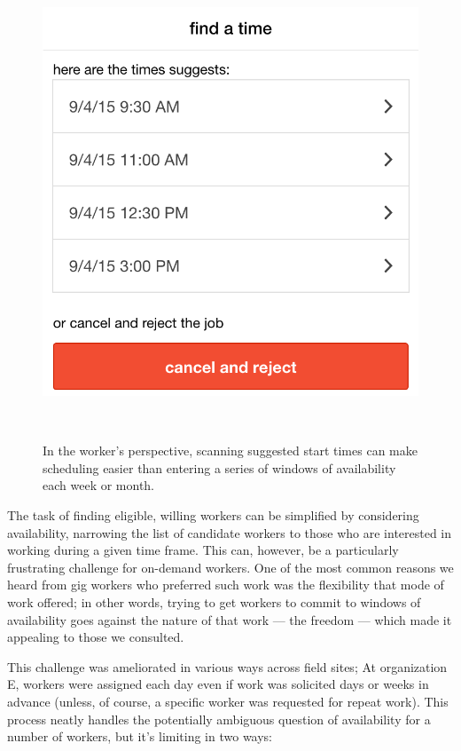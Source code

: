 \begin{figure}[t]
\centering
  \includegraphics[width=1\columnwidth]{figures/jobtimesoffer}
    \caption{In the worker's perspective, scanning suggested start times can make scheduling easier than entering a series of windows of availability each week or month.}~\label{fig:workerSchedule}
\end{figure}

The task of finding eligible, willing workers can be simplified by considering availability,
narrowing the list of candidate workers to those who are interested in working during a given time frame.
This can, however, be a particularly frustrating challenge for on-demand workers.
One of the most common reasons we heard from gig workers who preferred such work was the flexibility that mode of work offered;
in other words, trying to get workers to commit to windows of availability goes against the nature of that work --- the freedom --- which made it appealing to those we consulted.

This challenge was ameliorated in various ways across field sites; At organization E, workers were assigned each day even if work was solicited days or weeks in advance (unless, of course, a specific worker was requested for repeat work). This process neatly handles the potentially ambiguous question of availability for a number of workers, but it's limiting in two ways:

